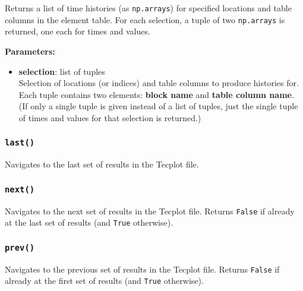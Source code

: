 Returns a list of time histories (as \texttt{np.arrays}) for specified locations and table columns in the element table.  For each selection, a tuple of two \texttt{np.arrays} is returned, one each for times and values.

\textbf{Parameters:}
\begin{itemize}
\item \textbf{selection}: list of tuples\\
  Selection of locations (or indices) and table columns to produce histories for.  Each tuple contains two elements: \textbf{block name} and \textbf{table column name}.  (If only a single tuple is given instead of a list of tuples, just the single tuple of times and values for that selection is returned.)
\end{itemize}

\begin{snugshade}
\subsubsection{\texttt{last()}}
\end{snugshade}
\label{sec:toughreact_tecplot:last}

Navigates to the last set of results in the Tecplot file.

\begin{snugshade}
\subsubsection{\texttt{next()}}
\end{snugshade}
\label{sec:toughreact_tecplot:next}

Navigates to the next set of results in the Tecplot file.  Returns \texttt{False} if already at the last set of results (and \texttt{True} otherwise).

\begin{snugshade}
\subsubsection{\texttt{prev()}}
\end{snugshade}
\label{sec:toughreact_tecplot:prev}

Navigates to the previous set of results in the Tecplot file.  Returns \texttt{False} if already at the first set of results (and \texttt{True} otherwise).

